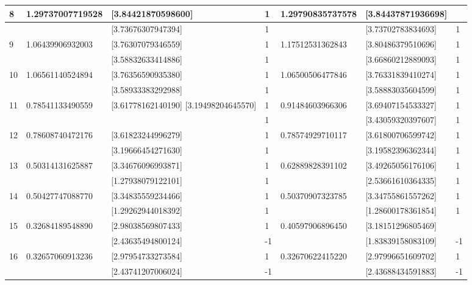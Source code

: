 \documentclass[10pt]{article}
\begin{document}
\begin{table}[h]
\begin{center}
\begin{tabular}{|l|l|l|l|l|l|l|}
\hline
\multirow[t]{2}{*}{8} & \multirow[t]{2}{*}{1.29737007719528} & [3.84421870598600] & 1 & 1.29790835737578 & [3.84437871936698] &  \\
\hline
 &  & [3.73676307947394] & 1 &  & [3.73702783834693] & 1 \\
\hline
\multirow[t]{2}{*}{9} & \multirow[t]{2}{*}{1.06439906932003} & [3.76307079346559] & 1 & 1.17512531362843 & [3.80486379510696] & 1 \\
\hline
 &  & [3.58832633414886] & 1 &  & [3.66860212889093] & 1 \\
\hline
10 & 1.06561140524894 & [3.76356590935380] & 1 & 1.06500506477846 & [3.76331839410274] & 1 \\
\hline
 &  & [3.58933383292988] & 1 &  & [3.58883035604599] & 1 \\
\hline
11 & 0.78541133490559 & [3.61778162140190] [3.19498204645570] & 1 & 0.91484603966306 & [3.69407154533327] & 1 \\
\hline
 &  &  & 1 &  & [3.43059320397607] & 1 \\
\hline
12 & 0.78608740472176 & [3.61823244996279] & 1 & 0.78574929710117 & [3.61800706599742] & 1 \\
\hline
 &  & [3.19666454271630] & 1 &  & [3.19582396362344] & 1 \\
\hline
\multirow[t]{2}{*}{13} & 0.50314131625887 & [3.34676096993871] & 1 & 0.62889828391102 & [3.49265056176106] & 1 \\
\hline
 &  & [1.27938079122101] & 1 &  & [2.53661610364335] & 1 \\
\hline
\multirow[t]{2}{*}{14} & \multirow[t]{2}{*}{0.50427747088770} & [3.34835559234466] & 1 & 0.50370907323785 & [3.34755861557262] & 1 \\
\hline
 &  & [1.29262944018392] & 1 &  & [1.28600178361854] & 1 \\
\hline
\multirow[t]{2}{*}{15} & \multirow[t]{2}{*}{0.32684189548890} & [2.98038569807433] & 1 & 0.40597906896450 & [3.18151296805469] &  \\
\hline
 &  & [2.43635494800124] & -1 &  & [1.83839158083109] & -1 \\
\hline
\multirow[t]{2}{*}{16} & \multirow[t]{2}{*}{0.32657060913236} & [2.97954733273584] & 1 & 0.32670622415220 & [2.97996651609702] & 1 \\
\hline
 &  & [2.43741207006024] & -1 &  & [2.43688434591883] & -1 \\
\hline
\end{tabular}
\end{center}
\end{table}
\end{document}

